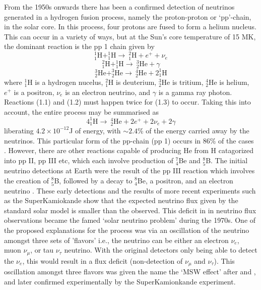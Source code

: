 From the 1950s onwards there has been a confirmed detection of neutrinos generated in a hydrogen fusion process, namely the proton-proton or \textquoteleft pp'-chain, in the solar core. In this process, four protons are fused to form a helium nucleus. This can occur in a variety of ways, but at the Sun's core temperature of 15 MK, the dominant reaction is the pp 1 chain given by
\begin{equation}
^{1}_1\mathrm{H} + ^{1}_1\mathrm{H} \rightarrow ~^{2}_1\mathrm{H} + e^{+}  + \nu_e
\end{equation}
\begin{equation}
^{2}_1\mathrm{H} + ^{1}_1\mathrm{H} \rightarrow ~^{3}_2\mathrm{He} + \gamma
\end{equation}
\begin{equation}
^{3}_2\mathrm{He}+^{3}_2\mathrm{He} \rightarrow ~^{4}_2\mathrm{He} + 2^{1}_1\mathrm{H}
\end{equation}
where $^{1}_1\mathrm{H}$ is a hydrogen nucelus, $^{2}_1\mathrm{H}$ is deuterium, $^{3}_2\mathrm{He}$ is tritium, $^{4}_2\mathrm{He}$ is helium, $e^{+}$ is a positron, $\nu_e$ is an electron neutrino, and $\gamma$ is a gamma ray photon. Reactions (1.1) and (1.2) must happen twice for (1.3) to occur. Taking this into account, the entire process may be summarised as 
\begin{equation}
4 ^{1}_1\mathrm{H}  \rightarrow ~^{4}_2\mathrm{He} + 2e^{+} + 2\nu_e + 2\gamma
\end{equation}
liberating $4.2\times10^{-12}$J of energy, with $\sim2.4$\% of the energy carried away by the neutrinos. This particular form of the pp-chain (pp 1) occurs in 86\% of the cases \citep{turk2011}. However, there are other reactions capable of producing He from H catagorized into pp II, pp III etc, which each involve production of $^7_4$Be and $^8_5$B. The initial neutrino detections at Earth were the result of the pp III reaction which involves the creation of $^8_5$B, followed by a decay to $^8_4$Be, a positron, and an electron neutrino \citep{davis1968}. These early detections and the results of more recent experiments such as the SuperKamiokande \citep{fukuda1998} show that the expected neutrino flux given by the standard solar model is smaller than the observed. This deficit in in neutrino flux observations became the famed \textquoteleft solar neutrino problem' during the 1970s. 
One of the proposed explanations for the process was via an oscillation of the neutrino amongst three sets of 'flavors' i.e., the neutrino can be either an electron $\nu_e$, muon $\nu_{\mu}$, or tau $\nu_{\tau}$ neutrino. With the original detectors only being able to detect the $\nu_e$, this would result in a flux deficit (non-detection of $\nu_{\mu}$ and $\nu_{\tau}$). This oscillation amongst three flavors was given the name the \textquoteleft MSW effect' after \citet{mikheev1986} and \citet{wolfenstein1978}, and later confirmed experimentally by the SuperKamionkande experiment.

